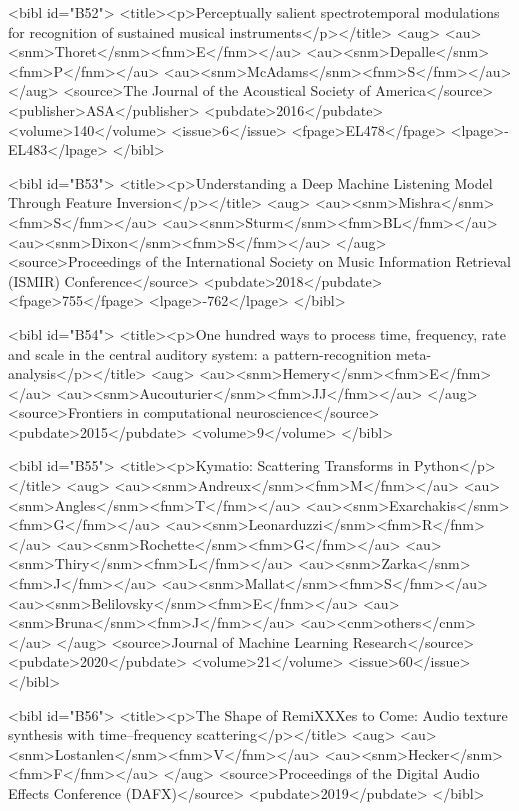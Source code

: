 \documentclass{bmcart}
\begin{document}
\begin{backmatter}
{<bibl id="B52">
  <title><p>Perceptually salient spectrotemporal modulations for recognition of
  sustained musical instruments</p></title>
  <aug>
    <au><snm>Thoret</snm><fnm>E</fnm></au>
    <au><snm>Depalle</snm><fnm>P</fnm></au>
    <au><snm>McAdams</snm><fnm>S</fnm></au>
  </aug>
  <source>The Journal of the Acoustical Society of America</source>
  <publisher>ASA</publisher>
  <pubdate>2016</pubdate>
  <volume>140</volume>
  <issue>6</issue>
  <fpage>EL478</fpage>
  <lpage>-EL483</lpage>
</bibl>

<bibl id="B53">
  <title><p>Understanding a Deep Machine Listening Model Through Feature
  Inversion</p></title>
  <aug>
    <au><snm>Mishra</snm><fnm>S</fnm></au>
    <au><snm>Sturm</snm><fnm>BL</fnm></au>
    <au><snm>Dixon</snm><fnm>S</fnm></au>
  </aug>
  <source>Proceedings of the International Society on Music Information
  Retrieval (ISMIR) Conference</source>
  <pubdate>2018</pubdate>
  <fpage>755</fpage>
  <lpage>-762</lpage>
</bibl>

<bibl id="B54">
  <title><p>One hundred ways to process time, frequency, rate and scale in the
  central auditory system: a pattern-recognition meta-analysis</p></title>
  <aug>
    <au><snm>Hemery</snm><fnm>E</fnm></au>
    <au><snm>Aucouturier</snm><fnm>JJ</fnm></au>
  </aug>
  <source>Frontiers in computational neuroscience</source>
  <pubdate>2015</pubdate>
  <volume>9</volume>
</bibl>

<bibl id="B55">
  <title><p>Kymatio: Scattering Transforms in Python</p></title>
  <aug>
    <au><snm>Andreux</snm><fnm>M</fnm></au>
    <au><snm>Angles</snm><fnm>T</fnm></au>
    <au><snm>Exarchakis</snm><fnm>G</fnm></au>
    <au><snm>Leonarduzzi</snm><fnm>R</fnm></au>
    <au><snm>Rochette</snm><fnm>G</fnm></au>
    <au><snm>Thiry</snm><fnm>L</fnm></au>
    <au><snm>Zarka</snm><fnm>J</fnm></au>
    <au><snm>Mallat</snm><fnm>S</fnm></au>
    <au><snm>Belilovsky</snm><fnm>E</fnm></au>
    <au><snm>Bruna</snm><fnm>J</fnm></au>
    <au><cnm>others</cnm></au>
  </aug>
  <source>Journal of Machine Learning Research</source>
  <pubdate>2020</pubdate>
  <volume>21</volume>
  <issue>60</issue>
</bibl>

<bibl id="B56">
  <title><p>The Shape of RemiXXXes to Come: Audio texture synthesis with
  time--frequency scattering</p></title>
  <aug>
    <au><snm>Lostanlen</snm><fnm>V</fnm></au>
    <au><snm>Hecker</snm><fnm>F</fnm></au>
  </aug>
  <source>Proceedings of the Digital Audio Effects Conference (DAFX)</source>
  <pubdate>2019</pubdate>
</bibl>

}
\end{backmatter}
\end{document}
